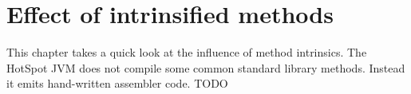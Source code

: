 \section{Effect of intrinsified methods}
\label{s:perf_intrinsics}
This chapter takes a quick look at the influence of method intrinsics.
The HotSpot JVM does not compile some common standard library methods. Instead it emits hand-written assembler code.
TODO
%
%
%
%
